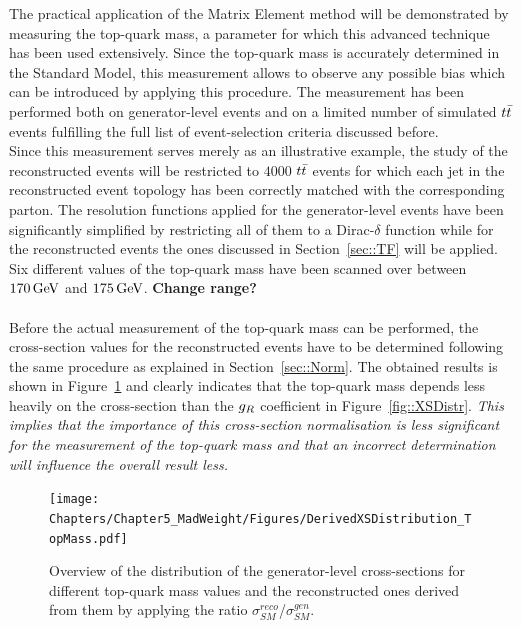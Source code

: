 The practical application of the Matrix Element method will be demonstrated by measuring the top-quark mass, a parameter for which this advanced technique has been used extensively.
Since the top-quark mass is accurately determined in the Standard Model, this measurement allows to observe any possible bias which can be introduced by applying this procedure.
The measurement has been performed both on generator-level events and on a limited number of simulated $t\bar{t}$ events fulfilling the full list of event-selection criteria discussed before.
\\
Since this measurement serves merely as an illustrative example, the study of the reconstructed events will be restricted to $4000$ $t\bar{t}$ events for which each jet in the reconstructed event topology has been correctly matched with the corresponding parton. 
The resolution functions applied for the generator-level events have been significantly simplified by restricting all of them to a Dirac-$\delta$ function while for the reconstructed events the ones discussed in Section~\ref{sec::TF} will be applied.
Six different values of the top-quark mass have been scanned over between $170 \, \mathrm{GeV}$ and $175\, \mathrm{GeV}$. \textbf{Change range?}
\\
\\
Before the actual measurement of the top-quark mass can be performed, the cross-section values for the reconstructed events have to be determined following the same procedure as explained in Section~\ref{sec::Norm}. The obtained results is shown in Figure~\ref{fig::XSDistrTop} and clearly indicates that the top-quark mass depends less heavily on the cross-section than the $g_{R}$ coefficient in Figure~\ref{fig::XSDistr}. 
\textit{This implies that the importance of this cross-section normalisation is less significant for the measurement of the top-quark mass and that an incorrect determination will influence the overall result less.}
\\
\begin{figure}[h!t]
 \centering
 \texttt{[image: Chapters/Chapter5\_MadWeight/Figures/DerivedXSDistribution\_TopMass.pdf]}
 \caption{Overview of the distribution of the generator-level cross-sections for different top-quark mass values and the reconstructed ones derived from them by applying the ratio $\sigma_{SM}^{reco}$/$\sigma_{SM}^{gen}$.} \label{fig::XSDistrTop}
\end{figure}

